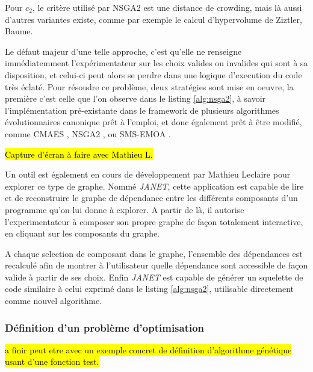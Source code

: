 Pour $c_2$, le critère utilisé par NSGA2 est une distance de crowding, mais là aussi d'autres variantes existe, comme par exemple le calcul d'hypervolume de Ziztler, Baume.

Le défaut majeur d'une telle approche, c'est qu'elle ne renseigne immédiatemment l'expérimentateur sur les choix valides ou invalides qui sont à sa disposition, et celui-ci peut alors se perdre dans une logique d'execution du code très éclaté. Pour résoudre ce problème, deux stratégies sont mise en oeuvre, la première c'est celle que l'on observe dans le listing \ref{alg:nsga2}, à savoir l'implémentation pré-existante dans le framework de plusieurs algorithmes évolutionnaires canonique prêt à l'emploi, et donc également prêt à être modifié, comme CMAES \autocite{Hansen}, NSGA2 \autocite{Deb2001}, ou SMS-EMOA \autocite{Beume2007}.

\hl{Capture d'écran à faire avec Mathieu L.}


Un outil est également en cours de développement par Mathieu Leclaire pour explorer ce type de graphe. Nommé \textit{JANET}, cette application est capable de lire et de reconstruire le graphe de dépendance entre les différents composants d'un programme qu'on lui donne à explorer. A partir de là, il autorise l'experimentateur à composer son propre graphe de façon totalement interactive, en cliquant sur les composants du graphe.

A chaque selection de composant dans le graphe, l'ensemble des dépendances est recalculé afin de montrer à l'utilisateur quelle dépendance sont accessible de façon valide à partir de ses choix. Enfin \textit{JANET} est capable de générer un squelette de code similaire à celui exprimé dans le listing \ref{alg:nsga2}, utilisable directement comme nouvel algorithme.

\subsubsection{Définition d'un problème d'optimisation}

\hl{a finir peut etre avec un exemple concret de définition d'algorithme génétique usant d'une fonction test.}

